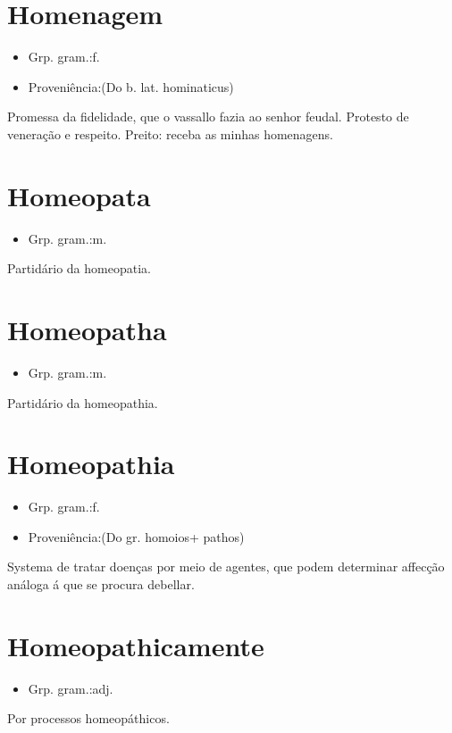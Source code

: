 \documentclass{article}
\begin{document}
\section{Homenagem}
\begin{itemize}
\item {Grp. gram.:f.}
\end{itemize}
\begin{itemize}
\item {Proveniência:(Do b. lat. \textunderscore hominaticus\textunderscore )}
\end{itemize}
Promessa da fidelidade, que o vassallo fazia ao senhor feudal.
Protesto de veneração e respeito.
Preito: \textunderscore receba as minhas homenagens\textunderscore .
\section{Homeopata}
\begin{itemize}
\item {Grp. gram.:m.}
\end{itemize}
Partidário da homeopatia.
\section{Homeopatha}
\begin{itemize}
\item {Grp. gram.:m.}
\end{itemize}
Partidário da homeopathia.
\section{Homeopathia}
\begin{itemize}
\item {Grp. gram.:f.}
\end{itemize}
\begin{itemize}
\item {Proveniência:(Do gr. \textunderscore homoios\textunderscore  + \textunderscore pathos\textunderscore )}
\end{itemize}
Systema de tratar doenças por meio de agentes, que podem determinar affecção análoga á que se procura debellar.
\section{Homeopathicamente}
\begin{itemize}
\item {Grp. gram.:adj.}
\end{itemize}
Por processos homeopáthicos.
\end{document}

